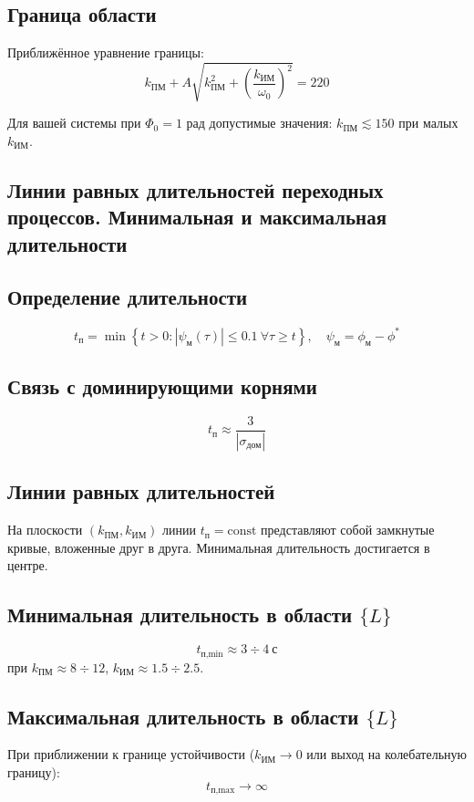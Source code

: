 \documentclass[14pt]{extreport}
\begin{document}
{\subsection*{Граница области}
Приближённое уравнение границы:
\[
k_{\text{ПМ}} + A \sqrt{k_{\text{ПМ}}^2 + \left(\frac{k_{\text{ИМ}}}{\omega_0}\right)^2} = 220
\]

Для вашей системы при $\Phi_0 = 1$ рад допустимые значения: $k_{\text{ПМ}} \lesssim 150$ при малых $k_{\text{ИМ}}$.

        \subsection{Линии равных длительностей переходных процессов. Минимальная и максимальная длительности}
        \subsection*{Определение длительности}
\[
t_{\text{п}} = \min \left\{ t > 0 : |\psi_{\text{м}}(\tau)| \leq 0.1 \ \forall \tau \geq t \right\}, \quad \psi_{\text{м}} = \phi_{\text{м}} - \phi^*
\]

\subsection*{Связь с доминирующими корнями}
\[
t_{\text{п}} \approx \frac{3}{|\sigma_{\text{дом}}|}
\]

\subsection*{Линии равных длительностей}
На плоскости $(k_{\text{ПМ}}, k_{\text{ИМ}})$ линии $t_{\text{п}} = \text{const}$ представляют собой замкнутые кривые, вложенные друг в друга. Минимальная длительность достигается в центре.

\subsection*{Минимальная длительность в области $\{L\}$}
\[
t_{\text{п,min}} \approx 3 \div 4\ \text{с}
\]
при $k_{\text{ПМ}} \approx 8 \div 12$, $k_{\text{ИМ}} \approx 1.5 \div 2.5$.

\subsection*{Максимальная длительность в области $\{L\}$}
При приближении к границе устойчивости ($k_{\text{ИМ}} \to 0$ или выход на колебательную границу):
\[
t_{\text{п,max}} \to \infty
\]

}
\end{document}
